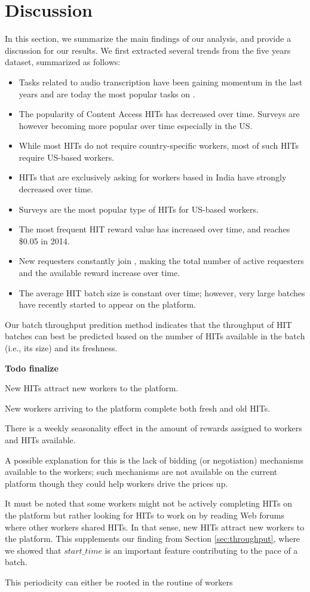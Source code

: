 \section{Discussion}
\label{sec:discuss}

In this section, we summarize the main findings of our analysis, and provide a discussion for our results. We first extracted several trends from the five years dataset, summarized as follows:
\begin{itemize}[noitemsep,topsep=0pt,parsep=0pt,partopsep=0pt]
	\item Tasks related to audio transcription have been gaining momentum in the last years and are today the most popular tasks on \amt{}.
	\item The popularity of Content Access HITs has decreased over time. Surveys are however becoming more popular over time especially in the US.
	\item While most HITs do not require country-specific workers, most of such HITs require US-based workers.
	\item HITs that are exclusively asking for workers based in India have strongly decreased over time.
	\item Surveys are the most popular type of HITs for US-based workers.
	\item The most frequent HIT reward value has increased over time, and reaches \$0.05 in 2014.
	\item New requesters constantly join \amt{}, making the total number of active requesters and the available reward increase over time.
	\item The average HIT batch size is constant over time; however, very large batches have recently started to appear on the platform.
\end{itemize}

Our batch throughput predition method indicates that the throughput of HIT batches can best be predicted based on the number of HITs available in the batch (i.e., its size) and its freshness. 


\textbf{Todo finalize}

New HITs attract new workers to the platform.

New workers arriving to the platform complete both fresh and old HITs.

There is a weekly seasonality effect in the amount of rewards assigned to workers and HITs available.



A possible explanation for this is the lack of bidding (or negotiation) mechanisms available to the workers; such mechanisms are not available on the current platform though they could help workers drive the prices up. 

It must be noted that some workers might not be actively completing HITs on the platform but rather looking for HITs to work on by reading Web forums where other workers shared HITs. In that sense, new HITs attract new workers to the platform. This supplements our finding from Section \ref{sec:throughput}, where we showed that $start\_time$ is an important feature contributing to the pace of a batch.


This periodicity can either be rooted in the routine of workers
